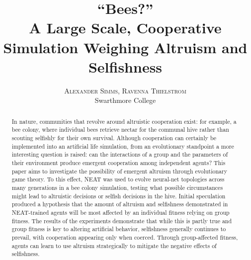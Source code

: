 \documentclass[twoside]{article}
\title{\vspace{-15mm}\fontsize{24pt}{10pt}\selectfont\textbf{``Bees?''\\\smallskip{} A Large Scale, Cooperative Simulation 
         Weighing Altruism and Selfishness}} %
\author{
\large
\textsc{Alexander Simms, Ravenna Thielstrom}\\[2mm] %
\normalsize Swarthmore College \\ %
\vspace{-5mm}
}
\date{}
\begin{document}
\maketitle %

\thispagestyle{fancy} %


\begin{abstract}

\noindent In nature, communities that revolve around altruistic cooperation exist: for example, a bee colony, where individual bees retrieve nectar for the communal hive rather than scouting selfishly for their own survival. Although cooperation can certainly be implemented into an artificial life simulation, from an evolutionary standpoint a more interesting question is raised: can the interactions of a group and the parameters of their environment produce emergent cooperation among independent agents? This paper aims to investigate the possibility of emergent altruism through evolutionary game theory. To this effect, NEAT was used to evolve neural-net topologies across many generations in a bee colony simulation, testing what possible circumstances might lead to altruistic decisions or selfish decisions in the hive. Initial speculation produced a hypothesis that the amount of altruism and selfishness demonstrated in NEAT-trained agents will be most affected by an individual fitness relying on group fitness. The results of the experiments demonstrate that while this is partly true and group fitness is key to altering artificial behavior, selfishness generally continues to prevail, with cooperation appearing only when coerced. Through group-affected fitness, agents can learn to use altruism strategically to mitigate the negative effects of selfishness.

\end{abstract}

\end{document}
